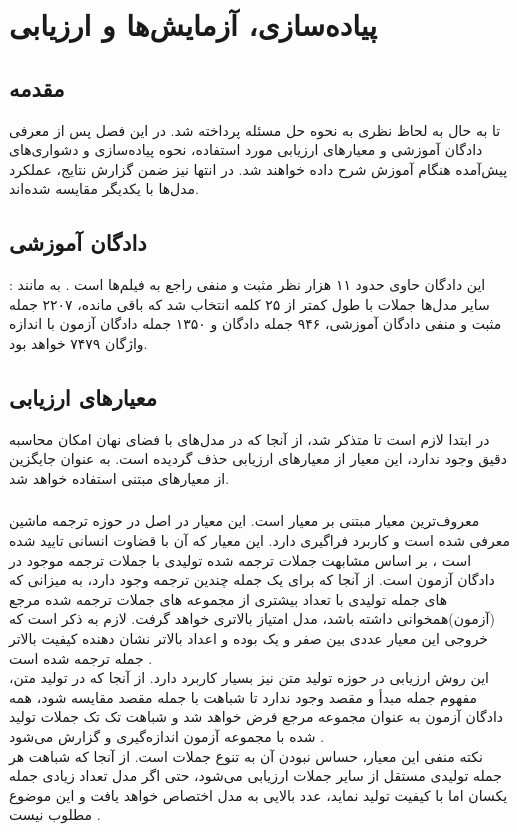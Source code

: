 \chapter{پیاده‌سازی، آزمایش‌ها و ارزیابی}\label{chap4}
\minitoc
\section{مقدمه}
تا به حال به لحاظ نظری به نحوه حل مسئله پرداخته شد. در این فصل پس از معرفی دادگان آموزشی و معیارهای ارزیابی مورد استفاده، نحوه پیاده‌سازی و دشواری‌های پیش‌آمده هنگام آموزش شرح داده خواهند شد. در انتها نیز ضمن گزارش نتایج، عملکرد مدل‌ها با یکدیگر مقایسه شده‌اند.
\section{دادگان آموزشی} \label{chap4:dataset}
:
این دادگان حاوی حدود ۱۱ هزار نظر مثبت و منفی راجع به فیلم‌ها است \cite{sst}. به مانند سایر مدل‌ها جملات با طول کمتر از ۲۵ کلمه انتخاب شد که باقی مانده، ۲۲۰۷ جمله مثبت و منفی دادگان آموزشی، ۹۴۶ جمله دادگان \validation{} و ۱۳۵۰ جمله دادگان آزمون با اندازه واژگان ۷۴۷۹ خواهد بود.

\section{معیارهای ارزیابی} \label{chap4:metrics}
در ابتدا لازم است تا متذکر شد، از آنجا که در مدل‌های با فضای نهان امکان محاسبه دقیق \likelihood{} وجود ندارد، این معیار از معیارهای ارزیابی حذف گردیده است. به عنوان جایگزین از معیار‌های مبتنی \ngramphrase{} استفاده خواهد شد.
\subsection{\bleu{}}
معروف‌ترین معیار مبتنی بر \ngramphrase{} معیار \bleu{} است. این معیار در اصل در حوزه ترجمه ماشین معرفی شده است و کاربرد فراگیری دارد. این معیار که 
آن با قضاوت انسانی تایید شده است \cite{bleu}، بر اساس مشابهت \ngramphrase{} جملات ترجمه شده تولیدی با جملات ترجمه موجود در دادگان آزمون است. از آنجا که برای یک جمله چندین ترجمه وجود دارد، به میزانی که \ngramphrase{}‌های جمله تولیدی با تعداد بیشتری از مجموعه \ngram{}‌های جملات ترجمه شده مرجع (آزمون)‌همخوانی داشته باشد، مدل امتیاز بالا‌تری خواهد گرفت. لازم به ذکر است که خروجی این معیار عددی بین صفر و یک بوده و اعداد بالاتر نشان دهنده کیفیت بالاتر جمله ترجمه شده است \cite{bleu}.
\\
این روش ارزیابی در حوزه تولید متن نیز بسیار کاربرد دارد. از آنجا که در تولید متن، مفهوم جمله مبدأ و مقصد وجود ندارد تا شباهت با جمله مقصد مقایسه شود، همه دادگان آزمون به عنوان مجموعه مرجع فرض خواهد شد و شباهت تک تک جملات تولید شده با مجموعه آزمون اندازه‌گیری و گزارش می‌شود \cite{seqgan}.
\\
نکته منفی این معیار، حساس نبودن آن به تنوع جملات است. از آنجا که شباهت هر جمله تولیدی مستقل از سایر جملات ارزیابی می‌شود، حتی اگر مدل تعداد زیادی جمله یکسان اما با کیفیت تولید نماید، عدد بالایی به مدل اختصاص خواهد یافت و این موضوع مطلوب نیست \cite{jointly}.
